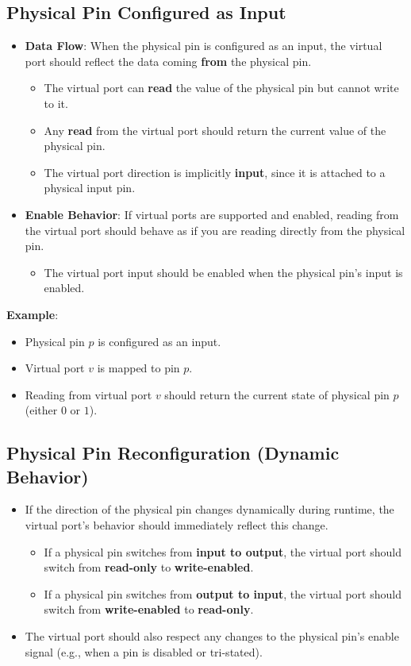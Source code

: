 \subsection{Physical Pin Configured as Input}
\begin{itemize}
    \item \textbf{Data Flow}: When the physical pin is configured as an input, the virtual port should reflect the data coming \textbf{from} the physical pin.
    \begin{itemize}
        \item The virtual port can \textbf{read} the value of the physical pin but cannot write to it.
        \item Any \textbf{read} from the virtual port should return the current value of the physical pin.
        \item The virtual port direction is implicitly \textbf{input}, since it is attached to a physical input pin.
    \end{itemize}
    \item \textbf{Enable Behavior}: If virtual ports are supported and enabled, reading from the virtual port should behave as if you are reading directly from the physical pin.
    \begin{itemize}
        \item The virtual port input should be enabled when the physical pin’s input is enabled.
    \end{itemize}
\end{itemize}

\textbf{Example}:
\begin{itemize}
    \item Physical pin $p$ is configured as an input.
    \item Virtual port $v$ is mapped to pin $p$.
    \item Reading from virtual port $v$ should return the current state of physical pin $p$ (either $0$ or $1$).
\end{itemize}

\subsection{Physical Pin Reconfiguration (Dynamic Behavior)}
\begin{itemize}
    \item If the direction of the physical pin changes dynamically during runtime, the virtual port’s behavior should immediately reflect this change.
    \begin{itemize}
        \item If a physical pin switches from \textbf{input to output}, the virtual port should switch from \textbf{read-only} to \textbf{write-enabled}.
        \item If a physical pin switches from \textbf{output to input}, the virtual port should switch from \textbf{write-enabled} to \textbf{read-only}.
    \end{itemize}
    \item The virtual port should also respect any changes to the physical pin's enable signal (e.g., when a pin is disabled or tri-stated).
\end{itemize}


